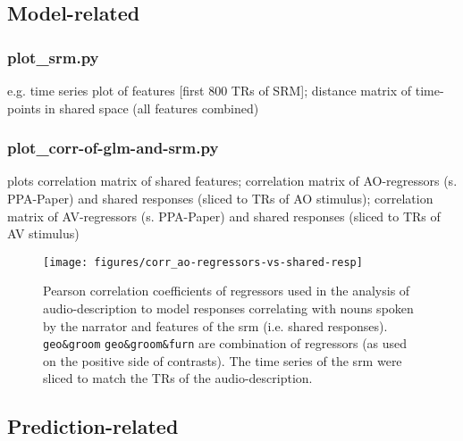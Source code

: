 

\subsection{Model-related}

\subsubsection{plot\_srm.py}


e.g. time series plot of features [first 800 TRs of SRM]; distance matrix of
time-points in shared space (all features combined)


\subsubsection{plot\_corr-of-glm-and-srm.py}


plots correlation matrix of shared features; correlation matrix of
AO-regressors (s. PPA-Paper) and shared responses (sliced to TRs of AO
stimulus); correlation matrix of AV-regressors (s. PPA-Paper) and shared
responses (sliced to TRs of AV stimulus)




\begin{figure*}[tbp]
\centering
    \texttt{[image: figures/corr\_ao-regressors-vs-shared-resp]}
    \caption{Pearson correlation coefficients of regressors used in the analysis
    of audio-description to model responses correlating with nouns spoken by the
    narrator and features of the \ac{srm} (i.e. shared responses).
    \texttt{geo\&groom} \texttt{geo\&groom\&furn} are combination of regressors
    (as used on the positive side of contrasts). The
    time series of the \ac{srm} were sliced to match the TRs of the
    audio-description.
      }
\label{fig:reg-corr}
\end{figure*}


\subsection{Prediction-related}

